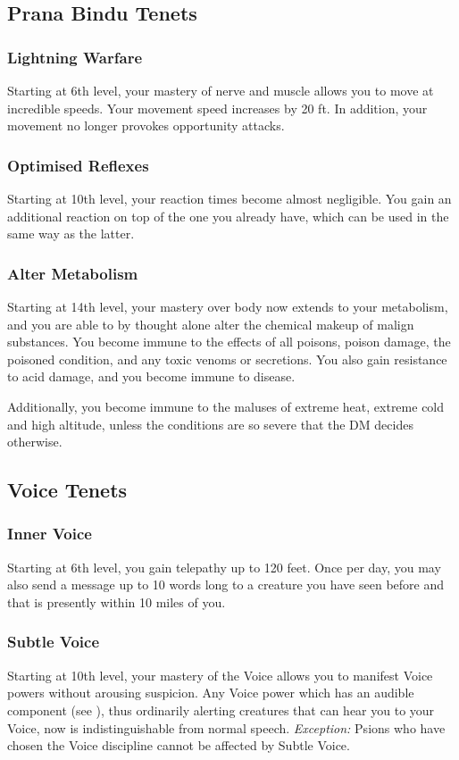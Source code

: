 \subsection{Prana Bindu Tenets}
\label{sub:prana_bindu_tenets}

\subsubsection{Lightning Warfare}
Starting at 6th level,
your mastery of nerve and muscle
allows you to move at incredible speeds.
Your movement speed increases by 20 ft.
In addition, your movement no longer provokes
opportunity attacks.

\subsubsection{Optimised Reflexes}
Starting at 10th level,
your reaction times become almost negligible.
You gain an additional reaction on top of the one
you already have, which can be used in the same way
as the latter.

\subsubsection{Alter Metabolism}
Starting at 14th level,
your mastery over body now extends to your metabolism,
and you are able to by thought alone
alter the chemical makeup of malign substances.
You become immune to the effects of all poisons,
poison damage, the poisoned condition, and any toxic venoms
or secretions.
You also gain resistance to acid damage,
and you become immune to disease.

Additionally, you become immune to the maluses of extreme heat,
extreme cold and high altitude,
unless the conditions are so severe
that the DM decides otherwise.

\subsection{Voice Tenets}

\subsubsection{Inner Voice}
Starting at 6th level,
you gain telepathy up to 120 feet.
Once per day,
you may also send a message up to 10 words long
to a creature you have seen before and that is
presently within 10 miles of you.

\subsubsection{Subtle Voice}
Starting at 10th level,
your mastery of the Voice allows you to manifest Voice
powers without arousing suspicion.
Any Voice power which has an audible component
(see ),
thus ordinarily alerting creatures that can hear you to your Voice,
now is indistinguishable from normal speech.
\emph{Exception:} Psions who have chosen the Voice discipline
cannot be affected by Subtle Voice.

